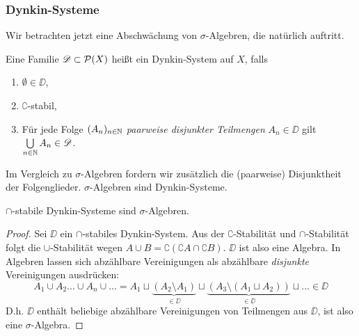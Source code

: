 \subsubsection{Dynkin-Systeme}
Wir betrachten jetzt eine Abschwächung von $\sigma$-Algebren, die natürlich auftritt.
\begin{definition}
\begin{mdframed}
Eine Familie $\mathscr{D} \subset \mathcal{P}(X)$ heißt ein Dynkin-System auf $X$, falls
\begin{enumerate}[(\roman*),topsep=5pt, itemsep = 0 pt]
	\item $\emptyset \in \DD$,
	\item $\complement$-stabil,
	\item Für jede Folge $(A_n)_{n \in \mathbb{N}}$ \emph{paarweise disjunkter Teilmengen} $A_n \in \DD$ gilt $\bigcup\limits_{n\in \mathbb{N}} A_n \in \mathscr{D}$.
\end{enumerate}
\end{mdframed}
Im Vergleich zu $\sigma$-Algebren fordern wir zusätzlich die (paarweise) Disjunktheit der Folgenglieder. $\sigma$-Algebren sind Dynkin-Systeme.
\end{definition}

\begin{proposition}
\begin{mdframed}
$\cap$-stabile Dynkin-Systeme sind $\sigma$-Algebren.
\end{mdframed}
\begin{proof}
Sei $\DD$ ein $\cap$-stabiles Dynkin-System. Aus der $\complement$-Stabilität und $\cap$-Stabilität folgt die $\cup$-Stabilität wegen $A\cup B=\complement(\complement A \cap \complement B)$. $\DD$ ist also eine Algebra. In Algebren lassen sich abzählbare Vereinigungen als abzählbare \emph{disjunkte} Vereinigungen ausdrücken:
\begin{equation*}
A_1 \cup A_2 ... \cup A_n \cup ... = A_1 \sqcup \underbrace{(A_2 \setminus A_1)}_{\in \DD} \sqcup \underbrace{(A_3 \setminus (A_1\sqcup A_2))}_{\in \DD} \sqcup ... \in \DD
\end{equation*}
D.h. $\DD$ enthält beliebige abzählbare Vereinigungen von Teilmengen aus $\DD$, ist also eine $\sigma$-Algebra.
\end{proof}
\end{proposition}

